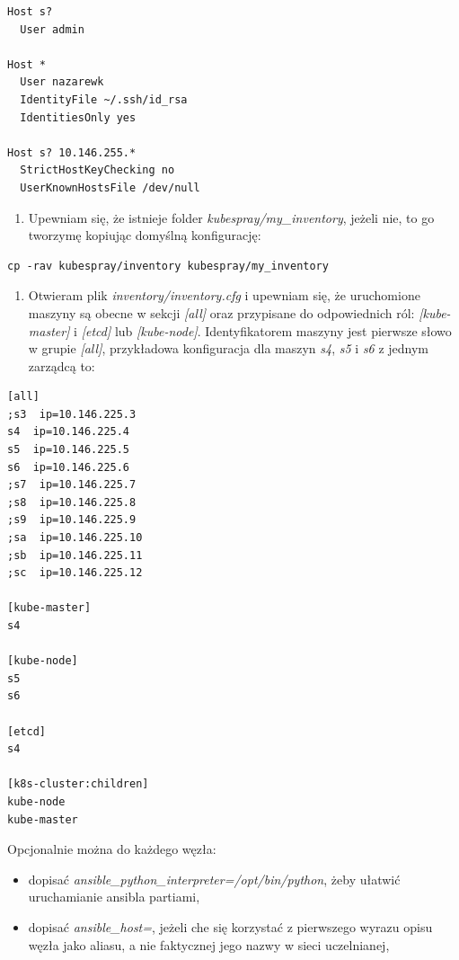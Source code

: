 \documentclass[a4paper,12pt,twoside,openany]{report}
\providecommand{\tightlist}{%
  \setlength{\itemsep}{0pt}\setlength{\parskip}{0pt}}
\begin{document}
\begin{lstlisting}
Host s?
  User admin

Host *
  User nazarewk
  IdentityFile ~/.ssh/id_rsa
  IdentitiesOnly yes

Host s? 10.146.255.*
  StrictHostKeyChecking no
  UserKnownHostsFile /dev/null
\end{lstlisting}

\begin{enumerate}
\def\labelenumi{\arabic{enumi}.}
\setcounter{enumi}{4}
\tightlist
\item
  Upewniam się, że istnieje folder \emph{kubespray/my\_inventory},
  jeżeli nie, to go tworzymę kopiując domyślną konfigurację:
\end{enumerate}

\begin{lstlisting}
cp -rav kubespray/inventory kubespray/my_inventory
\end{lstlisting}

\begin{enumerate}
\def\labelenumi{\arabic{enumi}.}
\setcounter{enumi}{5}
\tightlist
\item
  Otwieram plik \emph{inventory/inventory.cfg} i upewniam się, że
  uruchomione maszyny są obecne w sekcji \emph{{[}all{]}} oraz
  przypisane do odpowiednich ról: \emph{{[}kube-master{]}} i
  \emph{{[}etcd{]}} lub \emph{{[}kube-node{]}}. Identyfikatorem maszyny
  jest pierwsze słowo w grupie \emph{{[}all{]}}, przykładowa
  konfiguracja dla maszyn \emph{s4}, \emph{s5} i \emph{s6} z jednym
  zarządcą to:
\end{enumerate}

\begin{lstlisting}
[all]
;s3  ip=10.146.225.3
s4  ip=10.146.225.4
s5  ip=10.146.225.5
s6  ip=10.146.225.6
;s7  ip=10.146.225.7
;s8  ip=10.146.225.8
;s9  ip=10.146.225.9
;sa  ip=10.146.225.10
;sb  ip=10.146.225.11
;sc  ip=10.146.225.12

[kube-master]
s4

[kube-node]
s5
s6

[etcd]
s4

[k8s-cluster:children]
kube-node
kube-master
\end{lstlisting}

Opcjonalnie można do każdego węzła:

\begin{itemize}
\tightlist
\item
  dopisać \emph{ansible\_python\_interpreter=/opt/bin/python}, żeby
  ułatwić uruchamianie ansibla partiami,
\item
  dopisać \emph{ansible\_host=}, jeżeli che się korzystać z pierwszego
  wyrazu opisu węzła jako aliasu, a nie faktycznej jego nazwy w sieci
  uczelnianej,
\end{itemize}
\end{document}

